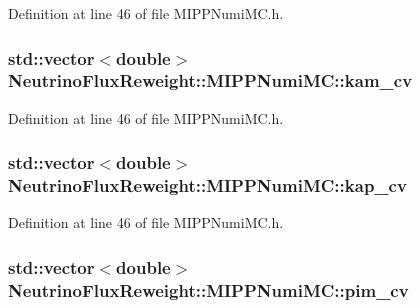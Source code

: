Definition at line 46 of file M\-I\-P\-P\-Numi\-M\-C.\-h.

\hypertarget{class_neutrino_flux_reweight_1_1_m_i_p_p_numi_m_c_a14a3f0aca4c12ee25194fea6bda18a43}{
\subsubsection[{kam\-\_\-cv}]{\setlength{\rightskip}{0pt plus 5cm}std\-::vector$<$double$>$ Neutrino\-Flux\-Reweight\-::\-M\-I\-P\-P\-Numi\-M\-C\-::kam\-\_\-cv\hspace{0.3cm}{\ttfamily [private]}}}\label{class_neutrino_flux_reweight_1_1_m_i_p_p_numi_m_c_a14a3f0aca4c12ee25194fea6bda18a43}


Definition at line 46 of file M\-I\-P\-P\-Numi\-M\-C.\-h.

\hypertarget{class_neutrino_flux_reweight_1_1_m_i_p_p_numi_m_c_afe6fc64f94bb6f2ded77ea88aee784aa}{
\subsubsection[{kap\-\_\-cv}]{\setlength{\rightskip}{0pt plus 5cm}std\-::vector$<$double$>$ Neutrino\-Flux\-Reweight\-::\-M\-I\-P\-P\-Numi\-M\-C\-::kap\-\_\-cv\hspace{0.3cm}{\ttfamily [private]}}}\label{class_neutrino_flux_reweight_1_1_m_i_p_p_numi_m_c_afe6fc64f94bb6f2ded77ea88aee784aa}


Definition at line 46 of file M\-I\-P\-P\-Numi\-M\-C.\-h.

\hypertarget{class_neutrino_flux_reweight_1_1_m_i_p_p_numi_m_c_a8aad49a86d53b5188e5287d850b9852d}{
\subsubsection[{pim\-\_\-cv}]{\setlength{\rightskip}{0pt plus 5cm}std\-::vector$<$double$>$ Neutrino\-Flux\-Reweight\-::\-M\-I\-P\-P\-Numi\-M\-C\-::pim\-\_\-cv\hspace{0.3cm}{\ttfamily [private]}}}\label{class_neutrino_flux_reweight_1_1_m_i_p_p_numi_m_c_a8aad49a86d53b5188e5287d850b9852d}


